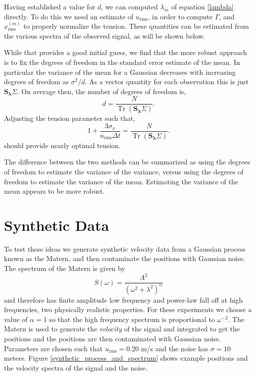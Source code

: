 \documentclass[twocol]{ametsoc}
\DeclareMathOperator{\Tr}{Tr}
\begin{document}
Having established a value for $d$, we can computed $\lambda_m$ of equation \ref{lambda} directly. To do this we need an estimate of $u_{\textrm{rms}}$, in order to compute $\Gamma$, and $x^{(m)}_{\textrm{rms}}$ to properly normalize the tension. These quantities can be estimated from the various spectra of the observed signal, as will be shown below.

While that provides a good initial guess, we find that the more robust approach is to fix the degrees of freedom in the standard error estimate of the mean. In particular the variance of the mean for a Gaussian decreases with increasing degrees of freedom as $\sigma^2/d$. As a vector quantity for each observation this is just $\mathbf{S_\lambda} \Sigma$. On average then, the number of degrees of freedom is,
\begin{equation}
d = \frac{N}{\Tr \left(\mathbf{S_\lambda} \Sigma \right) }.
\end{equation}
Adjusting the tension parameter such that,
\begin{equation}
\label{iterated_tension}
1 + \frac{3 \sigma_x}{u_{\textrm{rms}}\Delta t} = \frac{N}{\Tr \left(\mathbf{S_\lambda} \Sigma \right) }.
\end{equation}
should provide nearly optimal tension.

The difference between the two methods can be summarized as using the degrees of freedom to estimate the variance of the variance, versus using the degrees of freedom to estimate the variance of the mean. Estimating the variance of the mean appears to be more robust.

%
\section{Synthetic Data}
%

To test these ideas we generate synthetic velocity data from a Gaussian process known as the Matern, and then contaminate the positions with Gaussian noise. The spectrum of the Matern is given by
\begin{equation}
S(\omega) = \frac{A^2}{(\omega^2 + \lambda^2)^\alpha}
\end{equation}
and therefore has finite amplitude low frequency and power-law fall off at high frequencies, two physically realistic properties. For these experiments we choose a value of $\alpha=1$ so that the high frequency spectrum is proportional to $\omega^{-2}$. The Matern is used to generate the \emph{velocity} of the signal and integrated to get the positions and the positions are then contaminated with Gaussian noise. Parameters are chosen such that $u_{\textrm{rms}}=0.20$ m/s and the noise has $\sigma=10$ meters. Figure \ref{synthetic_process_and_spectrum} shows example positions and the velocity spectra of the signal and the noise.
\end{document}
